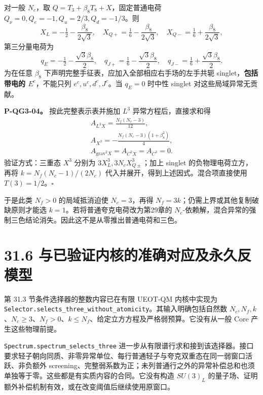 \documentclass[
  11pt,
  oneside]{book}
\begin{document}
对一般 \(N_c\)，取 \(Q=T_3+\beta_8T_8+X\)，固定普通电荷
\(Q_\nu=0,Q_e=-1,Q_u=2/3,Q_d=-1/3\)。则 \[
X_L=-\tfrac12-\frac{\beta_8}{2\sqrt3},\quad
X_{Q+}=\tfrac16-\frac{\beta_8}{2\sqrt3},\quad
X_{Q-}=\tfrac16+\frac{\beta_8}{2\sqrt3},
\] 第三分量电荷为 \[
q_E=-\tfrac12-\frac{\sqrt3\beta_8}{2},\quad
q_{J+}=\tfrac16-\frac{\sqrt3\beta_8}{2},\quad
q_{J-}=\tfrac16+\frac{\sqrt3\beta_8}{2}.
\] 为在任意 \(\beta_8\) 下声明完整手征表，应加入全部相应右手场的左手共轭
singlet，\textbf{包括带电的 \(E^c\)}，不能只列 \(e^c,u^c,d^c,J^c\)。当
\(q_E=0\) 时中性 singlet 对这些局域异常无贡献。

\protect\hypertarget{p-qg3-04}{}{}

\textbf{P-QG3-04。} 按此完整表示表并施加 \(L^3\) 异常方程后，直接求和得
\[
\begin{gathered}
A_{L^2X}=\frac{N_f(N_c-3)}{12},\\
A_{X^3}=-\frac{N_f(N_c-3)(1+\beta_8^2)}4,
\\ A_{\mathrm{grav}^2X}=A_{C^2X}=A_{C^3}=0.
\end{gathered}
\] 验证方式：三重态 \(X^3\) 分别为 \(3X_L^3,3N_cX_{Q\pm}^3\)；加上
singlet 的负物理电荷立方，再将 \(k=N_f(N_c-1)/(2N_c)\)
代入并展开，得到上述因式。混合项直接使用 \(T(3)=1/2\)。\(\square\)

于是此类 \(N_f>0\) 的局域抵消迫使 \(N_c=3\)，再得
\(N_f=3k\)；仍需上界或其他复制破缺原则才能选
\(k=1\)。若将普通夸克电荷改为第29章的
\(N_c\)-依赖解，混合异常的强制三色结论消失。因此这不是从零推出普通电荷和三色。

\hypertarget{ux4e0eux5df2ux9a8cux8bc1ux5185ux6838ux7684ux51c6ux786eux5bf9ux5e94ux53caux6c38ux4e45ux53cdux6a21ux578b}{%
\section{31.6
与已验证内核的准确对应及永久反模型}\label{ux4e0eux5df2ux9a8cux8bc1ux5185ux6838ux7684ux51c6ux786eux5bf9ux5e94ux53caux6c38ux4e45ux53cdux6a21ux578b}}

第 31.3 节条件选择器的整数内容已在有限 UEOT-QM 内核中实现为
\texttt{Selector.selects\_\allowbreak three\_\allowbreak without\_\allowbreak atomicity}。其输入明确包括自然数
\(N_c,N_f,k\)、\(N_c\ge3\)、\(N_f>0\)、\(k\le N_f\)、给定立方方程及严格弱预算。它没有从一般
Core 产生这些物理前提。

\texttt{Spectrum.spectrum\_\allowbreak selects\_\allowbreak three}
进一步从有限谱行求和接到该选择器。接口要求轻子朝向同质、非零异常单位、每行普通轻子与夸克双重态在同一弱窗口活跃、非负额外
screening、完整弱系数为正；未列普通行之外的异常补偿总和也须单独等于零。这些都是有实质内容的合同。它没有构造
\(SU(3)_L\)
的量子场、证明额外补偿机制有效，或在改变阈值后继续使用原窗口。
\end{document}
